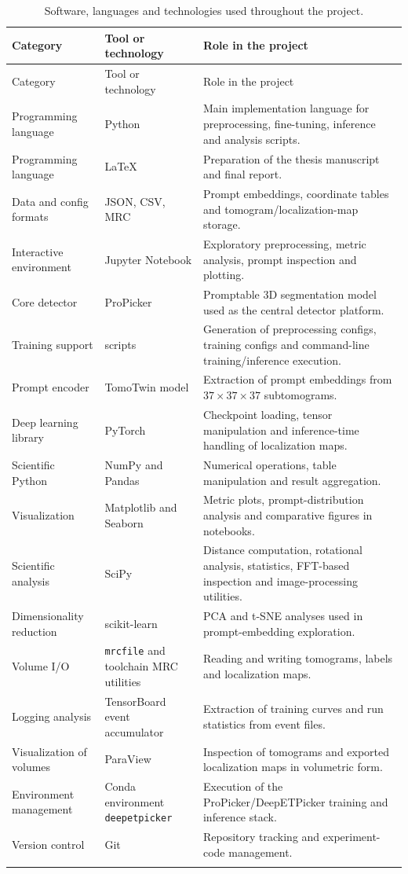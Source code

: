 \documentclass[12pt,a4paper]{report}
\begin{document}
\small
\begin{longtable}{P{0.18\textwidth}P{0.26\textwidth}P{0.48\textwidth}}
  \toprule
  Category & Tool or technology & Role in the project \\
  \midrule
  \endfirsthead
  \toprule
  Category & Tool or technology & Role in the project \\
  \midrule
  \endhead
  Programming language & Python & Main implementation language for preprocessing, fine-tuning, inference and analysis scripts. \\
  Programming language & LaTeX & Preparation of the thesis manuscript and final report. \\
  Data and config formats & JSON, CSV, MRC & Prompt embeddings, coordinate tables and tomogram/localization-map storage. \\
  Interactive environment & Jupyter Notebook & Exploratory preprocessing, metric analysis, prompt inspection and plotting. \\
  Core detector & ProPicker & Promptable 3D segmentation model used as the central detector platform. \\
  Training support &  scripts & Generation of preprocessing configs, training configs and command-line training/inference execution. \\
  Prompt encoder & TomoTwin model & Extraction of prompt embeddings from \(37 \times 37 \times 37\) subtomograms. \\
  Deep learning library & PyTorch & Checkpoint loading, tensor manipulation and inference-time handling of localization maps. \\
  Scientific Python & NumPy and Pandas & Numerical operations, table manipulation and result aggregation. \\
  Visualization & Matplotlib and Seaborn & Metric plots, prompt-distribution analysis and comparative figures in notebooks. \\
  Scientific analysis & SciPy & Distance computation, rotational analysis, statistics, FFT-based inspection and image-processing utilities. \\
  Dimensionality reduction & scikit-learn & PCA and t-SNE analyses used in prompt-embedding exploration. \\
  Volume I/O & \texttt{mrcfile} and toolchain MRC utilities & Reading and writing tomograms, labels and localization maps. \\
  Logging analysis & TensorBoard event accumulator & Extraction of training curves and run statistics from event files. \\
  Visualization of volumes & ParaView & Inspection of tomograms and exported localization maps in volumetric form. \\
  Environment management & Conda environment \texttt{deepetpicker} & Execution of the ProPicker/DeepETPicker training and inference stack. \\
  Version control & Git & Repository tracking and experiment-code management. \\
  \bottomrule
  \caption{Software, languages and technologies used throughout the project.}
  \label{tab:software-stack}
\end{longtable}
\normalsize
\end{document}
